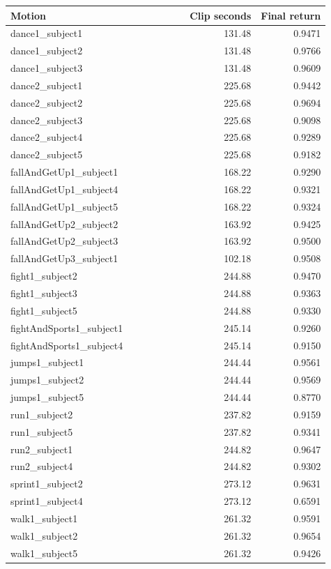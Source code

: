\begin{longtable}{@{}p{0.57\linewidth}rr@{}}
\toprule Motion & Clip seconds & Final return\\\midrule\endhead
dance1\_subject1 & 131.48 & 0.9471 \\
dance1\_subject2 & 131.48 & 0.9766 \\
dance1\_subject3 & 131.48 & 0.9609 \\
dance2\_subject1 & 225.68 & 0.9442 \\
dance2\_subject2 & 225.68 & 0.9694 \\
dance2\_subject3 & 225.68 & 0.9098 \\
dance2\_subject4 & 225.68 & 0.9289 \\
dance2\_subject5 & 225.68 & 0.9182 \\
fallAndGetUp1\_subject1 & 168.22 & 0.9290 \\
fallAndGetUp1\_subject4 & 168.22 & 0.9321 \\
fallAndGetUp1\_subject5 & 168.22 & 0.9324 \\
fallAndGetUp2\_subject2 & 163.92 & 0.9425 \\
fallAndGetUp2\_subject3 & 163.92 & 0.9500 \\
fallAndGetUp3\_subject1 & 102.18 & 0.9508 \\
fight1\_subject2 & 244.88 & 0.9470 \\
fight1\_subject3 & 244.88 & 0.9363 \\
fight1\_subject5 & 244.88 & 0.9330 \\
fightAndSports1\_subject1 & 245.14 & 0.9260 \\
fightAndSports1\_subject4 & 245.14 & 0.9150 \\
jumps1\_subject1 & 244.44 & 0.9561 \\
jumps1\_subject2 & 244.44 & 0.9569 \\
jumps1\_subject5 & 244.44 & 0.8770 \\
run1\_subject2 & 237.82 & 0.9159 \\
run1\_subject5 & 237.82 & 0.9341 \\
run2\_subject1 & 244.82 & 0.9647 \\
run2\_subject4 & 244.82 & 0.9302 \\
sprint1\_subject2 & 273.12 & 0.9631 \\
sprint1\_subject4 & 273.12 & 0.6591 \\
walk1\_subject1 & 261.32 & 0.9591 \\
walk1\_subject2 & 261.32 & 0.9654 \\
walk1\_subject5 & 261.32 & 0.9426 \\

\end{longtable}
